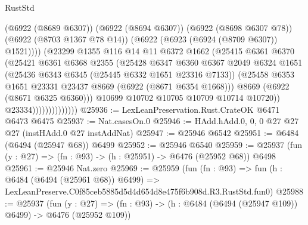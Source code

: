 \begin{lexlean}{RustStd}
\begin{coremodule}
                                  (@6922 (@8689 @6307))
                                  (@6922 (@8694 @6307))
                                  (@6922 (@8698 @6307 @78))
                                  (@6922 (@8703 @1367 @78 @14))
                                  (@6922 (@6923 (@6924 (@8709 @6307)) @1521))))
                              (@23299
                                @1355
                                @116
                                @14
                                @11
                                @6372
                                @1662
                                (@25415
                                  @6361
                                  @6370
                                  (@25421
                                    @6361
                                    @6368
                                    @2355
                                    (@25428
                                      @6347
                                      @6360
                                      @6367
                                      @2049
                                      @6324
                                      @1651
                                      (@25436 @6343 @6345 (@25445 @6332 @1651 @23316 @7133))
                                      (@25458
                                        @6353
                                        @1651
                                        @23331
                                        @23437
                                        @8669
                                        (@6922 (@8671 @6354 @1668)))
                                      @8669
                                      (@6922 (@8671 @6325 @6360)))
                                    @10699
                                    @10702
                                    @10705
                                    @10709
                                    @10714
                                    @10720))
                                @23334))))))))))))))
@25936 := LexLeanPreservation.Rust.CrateOK @6471 @6473 @6475
@25937 := Nat.casesOn.{0}
@25946 := HAdd.hAdd.{0, 0, 0} @27 @27 @27 (instHAdd.{0} @27 instAddNat)
@25947 := @25946 @6542
@25951 := @6484 (@6494 (@25947 @68)) @6499
@25952 := @25946 @6540
@25959 := @25937 (fun (y : @27) => (fn : @93) -> (h : @25951) -> @6476 (@25952 @68)) @6498
@25961 := @25946 Nat.zero
@25969 := @25959
    (fun (fn : @93) =>
    fun (h : @6484 (@6494 (@25961 @68)) @6499) =>
    LexLeanPreserve.C0f85ceb5885d5d4d654d8e475f6b908d.R3.RustStd.fun0)
@25988 := @25937
    (fun (y : @27) => (fn : @93) -> (h : @6484 (@6494 (@25947 @109)) @6499) -> @6476 (@25952 @109))

\end{coremodule}
\end{lexlean}
